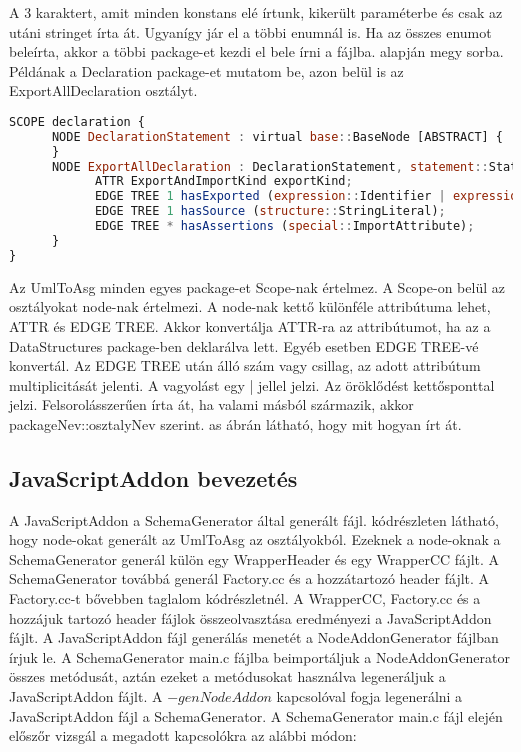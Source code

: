 A 3 karaktert, amit minden konstans elé írtunk, kikerült paraméterbe és csak az utáni stringet írta át.
Ugyanígy jár el a többi enumnál is.
Ha az összes enumot beleírta, akkor a többi package-et kezdi el bele írni a fájlba.  alapján megy sorba.
Példának a Declaration package-et mutatom be, azon belül is az ExportAllDeclaration osztályt.

\begin{lstlisting}[caption={Asg fájl ExportAllDeclaration},label={lst:asg_file_export_all_declaration}, language={JavaScript}]
SCOPE declaration {
      NODE DeclarationStatement : virtual base::BaseNode [ABSTRACT] {
      }
      NODE ExportAllDeclaration : DeclarationStatement, statement::Statement, virtual statement::ProgramStatement, special::Node {
            ATTR ExportAndImportKind exportKind;
            EDGE TREE 1 hasExported (expression::Identifier | expression::LiteralExpression);
            EDGE TREE 1 hasSource (structure::StringLiteral);
            EDGE TREE * hasAssertions (special::ImportAttribute);
      }
}
\end{lstlisting}

Az UmlToAsg minden egyes package-et Scope-nak értelmez.
A Scope-on belül az osztályokat node-nak értelmezi.
A node-nak kettő különféle attribútuma lehet, ATTR és EDGE TREE.
Akkor konvertálja ATTR-ra az attribútumot, ha az a DataStructures package-ben deklarálva lett. Egyéb esetben EDGE TREE-vé konvertál.
Az EDGE TREE után álló szám vagy csillag, az adott attribútum multiplicitását jelenti.
A vagyolást egy | jellel jelzi.
Az öröklődést kettősponttal jelzi.
Felsorolásszerűen írta át, ha valami másból származik, akkor packageNev::osztalyNev szerint.
as ábrán látható, hogy mit hogyan írt át.

\subsection{JavaScriptAddon bevezetés}\label{chap:javaScriptAddon_bevezetes}

\noindent

A JavaScriptAddon a SchemaGenerator által generált fájl.
 kódrészleten látható, hogy node-okat generált az UmlToAsg az osztályokból.
Ezeknek a node-oknak a SchemaGenerator generál külön egy WrapperHeader és egy WrapperCC fájlt.
A SchemaGenerator továbbá generál Factory.cc és a hozzátartozó header fájlt. A Factory.cc-t bővebben taglalom  kódrészletnél.
A WrapperCC, Factory.cc és a hozzájuk tartozó header fájlok összeolvasztása eredményezi a JavaScriptAddon fájlt.
A JavaScriptAddon fájl generálás menetét a NodeAddonGenerator fájlban írjuk le.
A SchemaGenerator main.c fájlba beimportáljuk a NodeAddonGenerator összes metódusát, aztán ezeket a metódusokat használva legeneráljuk a JavaScriptAddon fájlt.
A $-genNodeAddon$ kapcsolóval fogja legenerálni a JavaScriptAddon fájl a SchemaGenerator.
A SchemaGenerator main.c fájl elején előszőr vizsgál a megadott kapcsolókra az alábbi módon:

